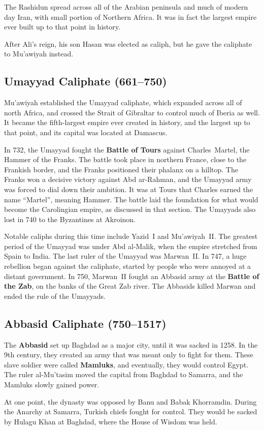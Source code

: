 The Rashidun spread across all of the Arabian peninsula and much of modern day Iran,
with small portion of Northern Africa.
It was in fact the largest empire ever built up to that point in history.

After Ali's reign, his son Hasan was elected as caliph, but he gave the caliphate to Mu'awiyah instead.

\subsection*{Umayyad Caliphate (661--750)}

Mu'awiyah established the Umayyad caliphate, which expanded across all of north Africa,
and crossed the Strait of Gibraltar to control much of Iberia as well.
It became the fifth-largest empire ever created in history, and the largest up to that point,
and its capital was located at Damascus.

In 732, the Umayyad fought the \textbf{Battle of Tours} against Charles~Martel, the Hammer of the Franks.
The battle took place in northern France, close to the Frankish border,
and the Franks positioned their phalanx on a hilltop.
The Franks won a decisive victory against Abd ar-Rahman,
and the Umayyad army was forced to dial down their ambition.
It was at Tours that Charles earned the name ``Martel'', meaning Hammer.
The battle laid the foundation for what would become the Carolingian empire, as discussed in that section.
The Umayyads also lost in 740 to the Byzantines at Akroinon.

Notable caliphs during this time include Yazid~I and Mu'awiyah~II\@.
The greatest period of the Umayyad was under Abd al-Malik,
when the empire stretched from Spain to India.
The last ruler of the Umayyad was Marwan~II\@.
In 747, a huge rebellion began against the caliphate, started by people who were annoyed at a distant government.
In 750, Marwan~II fought an Abbasid army at the \textbf{Battle of the Zab},
on the banks of the Great Zab river.
The Abbasids killed Marwan and ended the rule of the Umayyads.

\subsection*{Abbasid Caliphate (750--1517)}

The \textbf{Abbasid} set up Baghdad as a major city, until it was sacked in 1258.
In the 9th century, they created an army that was meant only to fight for them.
These slave soldier were called \textbf{Mamluks}, and eventually, they would control Egypt.
The ruler al-Mu'tasim moved the capital from Baghdad to Samarra, and the Mamluks slowly gained power.

At one point, the dynasty was opposed by Banu and Babak Khorramdin.
During the Anarchy at Samarra, Turkish chiefs fought for control.
They would be sacked by Hulagu Khan at Baghdad, where the House of Wisdom was held.
